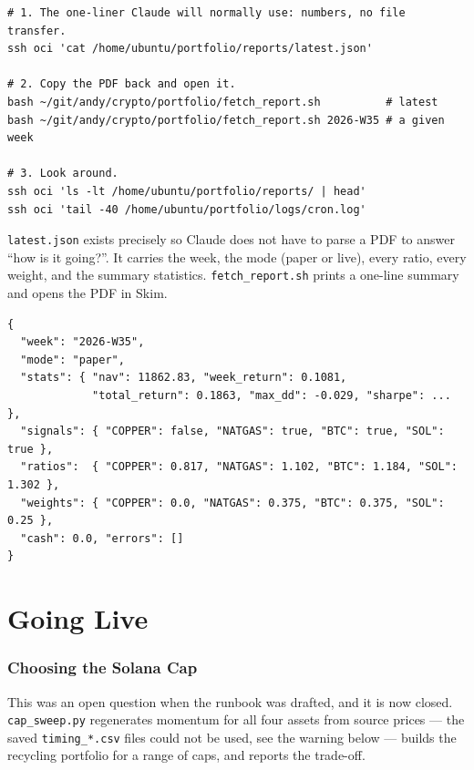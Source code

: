 \documentclass[11pt,a4paper]{article}
\begin{document}
\begin{codebox}
\begin{lstlisting}[style=shell]
# 1. The one-liner Claude will normally use: numbers, no file transfer.
ssh oci 'cat /home/ubuntu/portfolio/reports/latest.json'

# 2. Copy the PDF back and open it.
bash ~/git/andy/crypto/portfolio/fetch_report.sh          # latest
bash ~/git/andy/crypto/portfolio/fetch_report.sh 2026-W35 # a given week

# 3. Look around.
ssh oci 'ls -lt /home/ubuntu/portfolio/reports/ | head'
ssh oci 'tail -40 /home/ubuntu/portfolio/logs/cron.log'
\end{lstlisting}
\end{codebox}

\texttt{latest.json} exists precisely so Claude does not have to parse a
PDF to answer ``how is it going?''. It carries the week, the mode
(paper or live), every ratio, every weight, and the summary statistics.
\texttt{fetch\_report.sh} prints a one-line summary and opens the PDF in
Skim.

\begin{codebox}
\begin{lstlisting}[style=shell]
{
  "week": "2026-W35",
  "mode": "paper",
  "stats": { "nav": 11862.83, "week_return": 0.1081,
             "total_return": 0.1863, "max_dd": -0.029, "sharpe": ... },
  "signals": { "COPPER": false, "NATGAS": true, "BTC": true, "SOL": true },
  "ratios":  { "COPPER": 0.817, "NATGAS": 1.102, "BTC": 1.184, "SOL": 1.302 },
  "weights": { "COPPER": 0.0, "NATGAS": 0.375, "BTC": 0.375, "SOL": 0.25 },
  "cash": 0.0, "errors": []
}
\end{lstlisting}
\end{codebox}

\part{Going Live}

\section{Choosing the Solana Cap}
\label{sec:cap}

This was an open question when the runbook was drafted, and it is now
closed. \texttt{cap\_sweep.py} regenerates momentum for all four assets
from source prices --- the saved \texttt{timing\_*.csv} files could not
be used, see the warning below --- builds the recycling portfolio for a
range of caps, and reports the trade-off.
\end{document}
